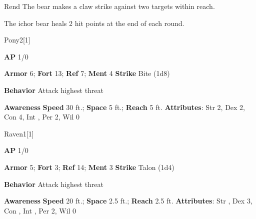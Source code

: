 \begin{freeability}{Rend}
The bear makes a claw strike against two targets within reach.
\end{freeability}

The ichor bear heals 2 hit points at the end of each round.

\begin{monsection}{Pony}{2}[1]
\vspace{-1em}\vspace{-1em}
\begin{spellcontent}
\begin{spelltargetinginfo}
{\textbf{AP} 1/0}

\pari \textbf{Armor} 6;
\textbf{Fort} 13;
\textbf{Ref} 7;
\textbf{Ment} 4
\pari \textbf{Strike} Bite  (1d8)



\pari \textbf{Behavior} Attack highest threat
\end{spelltargetinginfo}
\end{spellcontent}

\begin{monsterfooter}
\pari \textbf{Awareness} 
\pari \textbf{Speed} 30 ft.;
\textbf{Space} 5 ft.;
\textbf{Reach} 5 ft.
\pari \textbf{Attributes}:
Str 2,
Dex 2,
Con 4,
Int ,
Per 2,
Wil 0
\end{monsterfooter}
\end{monsection}

\begin{monsection}{Raven}{1}[1]
\vspace{-1em}\vspace{-1em}
\begin{spellcontent}
\begin{spelltargetinginfo}
{\textbf{AP} 1/0}

\pari \textbf{Armor} 5;
\textbf{Fort} 3;
\textbf{Ref} 14;
\textbf{Ment} 3
\pari \textbf{Strike} Talon  (1d4)



\pari \textbf{Behavior} Attack highest threat
\end{spelltargetinginfo}
\end{spellcontent}

\begin{monsterfooter}
\pari \textbf{Awareness} 
\pari \textbf{Speed} 20 ft.;
\textbf{Space} 2.5 ft.;
\textbf{Reach} 2.5 ft.
\pari \textbf{Attributes}:
Str ,
Dex 3,
Con ,
Int ,
Per 2,
Wil 0
\end{monsterfooter}
\end{monsection}

